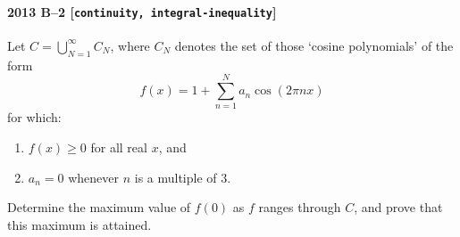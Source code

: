 \paragraph{2013 B--2 \textnormal{[\texttt{continuity, integral-inequality}]}}
Let $C = \bigcup_{N=1}^\infty C_N$, where $C_N$ denotes the set of those `cosine polynomials' of the form
\[
f(x) = 1 + \sum_{n=1}^N a_n \cos(2 \pi n x)
\]
for which:
\begin{enumerate}
\item[(i)]
$f(x) \geq 0$ for all real $x$, and
\item[(ii)]
$a_n = 0$ whenever $n$ is a multiple of $3$.
\end{enumerate}
Determine the maximum value of $f(0)$ as $f$ ranges through $C$, and
prove that this maximum is attained.
